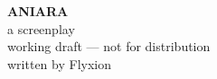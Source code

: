 \documentclass[12pt]{article}
\begin{document}
\thispagestyle{empty}
\begin{center}
\vspace*{2.5in}
{\LARGE \bfseries ANIARA}\\[0.4in]
{\normalsize a screenplay}\\[1.8in]
{\normalsize working draft --- not for distribution}\\[0.15in]
{\normalsize written by Flyxion}
\end{center}
\newpage

\setcounter{page}{1}


\end{document}
